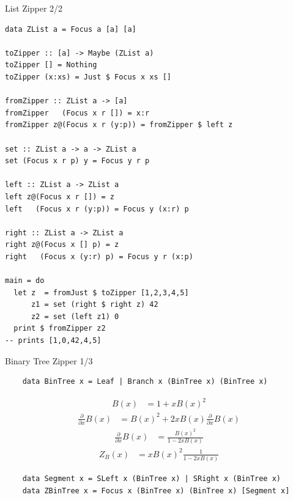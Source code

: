 \documentclass[pdf]{beamer}
\begin{document}
\begin{frame}[fragile]{List Zipper 2/2}
  \begin{verbatim}
data ZList a = Focus a [a] [a]

toZipper :: [a] -> Maybe (ZList a)
toZipper [] = Nothing
toZipper (x:xs) = Just $ Focus x xs []

fromZipper :: ZList a -> [a]
fromZipper   (Focus x r []) = x:r
fromZipper z@(Focus x r (y:p)) = fromZipper $ left z

set :: ZList a -> a -> ZList a
set (Focus x r p) y = Focus y r p

left :: ZList a -> ZList a
left z@(Focus x r []) = z
left   (Focus x r (y:p)) = Focus y (x:r) p

right :: ZList a -> ZList a
right z@(Focus x [] p) = z
right   (Focus x (y:r) p) = Focus y r (x:p)

main = do
  let z  = fromJust $ toZipper [1,2,3,4,5]
      z1 = set (right $ right z) 42
      z2 = set (left z1) 0
  print $ fromZipper z2
-- prints [1,0,42,4,5]
  \end{verbatim}
\end{frame}

\begin{frame}[fragile]{Binary Tree Zipper 1/3}
  \begin{verbatim}
    data BinTree x = Leaf | Branch x (BinTree x) (BinTree x)
  \end{verbatim}
  \begin{align*}
    B(x) &= 1 + x B(x)^2
  \end{align*}
  \begin{align*}
    \frac{\partial}{\partial{x}}B(x) &= B(x)^2 + 2 x B(x) \frac{\partial}{\partial{x}}B(x)
  \end{align*}
  \begin{align*}
    \frac{\partial}{\partial{x}}B(x) &= \frac{B(x)^2}{1 - 2 x B(x)}
  \end{align*}
  \begin{align*}
    Z_B(x) &= x B(x)^2 \frac{1}{1 - 2 x B(x)}
  \end{align*}
  \begin{verbatim}
    data Segment x = SLeft x (BinTree x) | SRight x (BinTree x)
    data ZBinTree x = Focus x (BinTree x) (BinTree x) [Segment x]
  \end{verbatim}
\end{frame}
\end{document}
